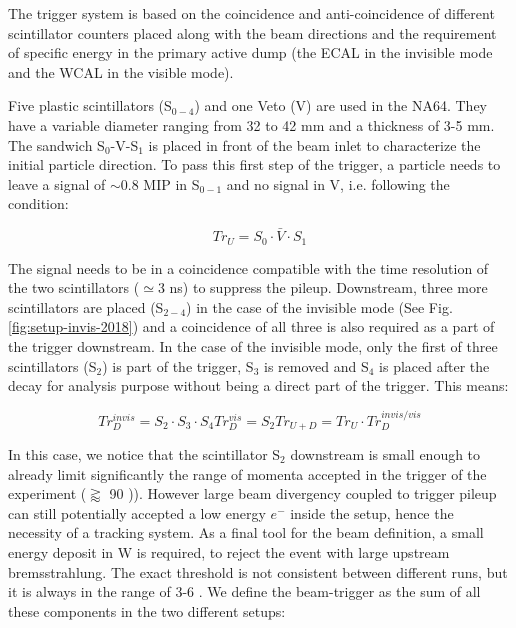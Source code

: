 The trigger system is based on the coincidence and anti-coincidence of different scintillator counters placed along with the beam directions and the requirement of specific energy in the primary active dump (the ECAL in the invisible mode and the WCAL in the visible mode).

Five plastic scintillators (S$_{0-4}$) and one Veto (V) are used in the NA64. They have a variable diameter ranging from 32 to 42 \si{mm} and a thickness of 3-5 \si{mm}. The sandwich S$_0$-V-S$_1$ is placed in front of the beam inlet to characterize the initial particle direction. To pass this first step of the trigger, a particle needs to leave a signal of $\sim$0.8 MIP in S$_{0-1}$ and no signal in V, i.e. following the condition:

\begin{equation}
\label{eq:trigger-upstream}
Tr_U = S_0 \cdot \bar{V} \cdot S_1
\end{equation}

The signal needs to be in a coincidence compatible with the time resolution of the two scintillators ($\simeq$3 \si{ns}) to suppress the pileup. Downstream, three more scintillators are placed (S$_{2-4}$) in the case of the invisible mode (See Fig.\ref{fig:setup-invis-2018}) and a coincidence of all three is also required as a part of the trigger downstream. In the case of the invisible mode, only the first of three scintillators (S$_2$) is part of the trigger, S$_3$ is removed and S$_4$ is placed after the decay for analysis purpose without being a direct part of the trigger. This means:

\begin{equation}
\label{eq:trigger-downstream}
Tr^{invis}_D = S_2 \cdot S_3 \cdot S_4
Tr^{vis}_D = S_2
Tr_{U+D} = Tr_U \cdot Tr^{invis/vis}_D
\end{equation}

In this case, we notice that the scintillator S$_2$ downstream is small enough to already limit significantly the range of momenta accepted in the trigger of the experiment ($\gtrapprox$ 90 \si{\gev})). However large beam divergency coupled to trigger pileup can still potentially accepted a low energy $e^-$ inside the setup, hence the necessity of a tracking system. As a final tool for the beam definition, a small energy deposit in W is required, to reject the event with large upstream bremsstrahlung. The exact threshold is not consistent between different runs, but it is always in the range of 3-6 \gev. We define the beam-trigger as the sum of all these components in the two different setups:

